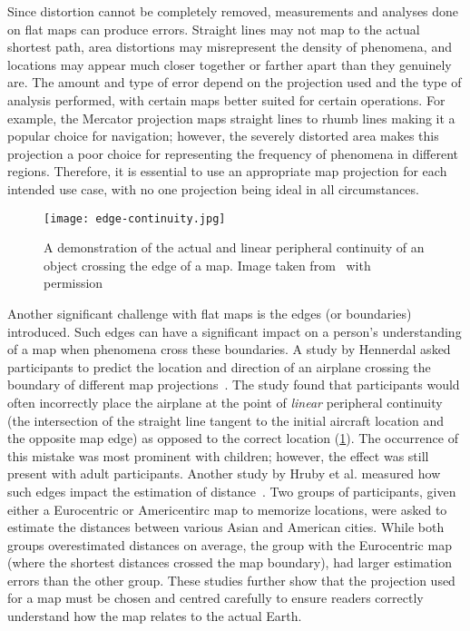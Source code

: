 Since distortion cannot be completely removed, measurements and analyses done on flat maps can produce errors.
Straight lines may not map to the actual shortest path, area distortions may misrepresent the density of phenomena, and locations may appear much closer together or farther apart than they genuinely are.
The amount and type of error depend on the projection used and the type of analysis performed, with certain maps better suited for certain operations.
For example, the Mercator projection maps straight lines to rhumb lines making it a popular choice for navigation; however, the severely distorted area makes this projection a poor choice for representing the frequency of phenomena in different regions.
Therefore, it is essential to use an appropriate map projection for each intended use case, with no one projection being ideal in all circumstances.


\begin{figure}[ht!]
	\centering
	\texttt{[image: edge-continuity.jpg]}
	\caption[Actual vs. linear peripheral continuity on a map]{
		A demonstration of the actual and linear peripheral continuity of an object crossing the edge of a map.
		Image taken from~\cite{hennerdal2015beyond} with permission
	}
	\label{fig:edge-continuity}
\end{figure}


Another significant challenge with flat maps is the edges (or boundaries) introduced.
Such edges can have a significant impact on a person's understanding of a map when phenomena cross these boundaries.
A study by Hennerdal asked participants to predict the location and direction of an airplane crossing the boundary of different map projections~\cite{hennerdal2015beyond}.
The study found that participants would often incorrectly place the airplane at the point of \textit{linear} peripheral continuity (the intersection of the straight line tangent to the initial aircraft location and the opposite map edge) as opposed to the correct location (\cref{fig:edge-continuity}).
The occurrence of this mistake was most prominent with children; however, the effect was still present with adult participants. Another study by Hruby et al. measured how such edges impact the estimation of distance~\cite{hruby2016journey}.
Two groups of participants, given either a Eurocentric or Americentirc map to memorize locations, were asked to estimate the distances between various Asian and American cities.
While both groups overestimated distances on average, the group with the Eurocentric map (where the shortest distances crossed the map boundary), had larger estimation errors than the other group.
These studies further show that the projection used for a map must be chosen and centred carefully to ensure readers correctly understand how the map relates to the actual Earth.


